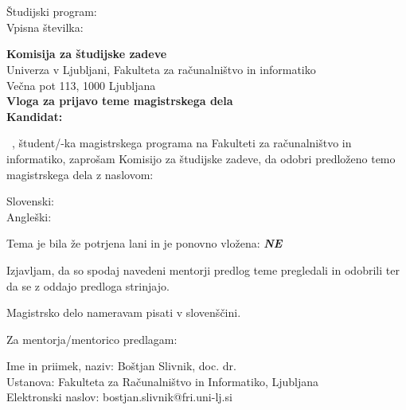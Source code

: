 \documentclass[a4paper, 12pt]{article}
\begin{document}


\newcommand{\Kandidat}{\ImeKandidata~\PriimekKandidata}
\noindent
\Kandidat\\
\NaslovBivalisca \\
Študijski program: \StudijskiProgram \\
Vpisna številka: \VpisnaStevilka
\bigskip

{\bf Komisija za študijske zadeve}\\
Univerza v Ljubljani, Fakulteta za računalništvo in informatiko\\
Večna pot 113, 1000 Ljubljana\\

{\Large\bf
{\centering
    Vloga za prijavo teme magistrskega dela \\%
\large Kandidat: \Kandidat \\[10mm]}}


\Kandidat, študent/-ka magistrskega programa na Fakulteti za računalništvo in informatiko, zaprošam Komisijo za študijske zadeve, da odobri predloženo temo magistrskega dela z naslovom:

Slovenski: {\bf \SLONaslov}\\
Angleški: {\bf \ENGNaslov}

Tema je bila že potrjena lani in je ponovno vložena: {\bf \textit{NE} }

Izjavljam, da so spodaj navedeni mentorji predlog teme pregledali in odobrili ter da se z oddajo predloga strinjajo.

Magistrsko delo nameravam pisati v slovenščini.

Za mentorja/mentorico predlagam:

\hfill\begin{minipage}{\dimexpr\textwidth-2cm}
Ime in priimek, naziv: Boštjan Slivnik, doc. dr. \\
Ustanova: Fakulteta za Računalništvo in Informatiko, Ljubljana \\
Elektronski naslov: bostjan.slivnik@fri.uni-lj.si
\end{minipage}

\hfill

\end{document}
